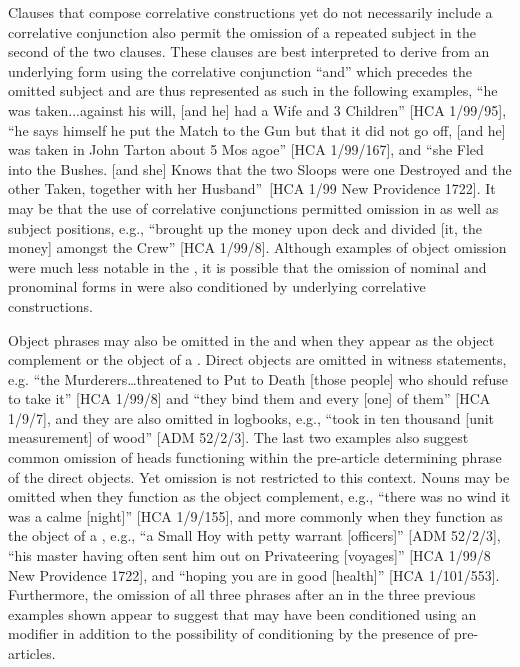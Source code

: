 Clauses that compose correlative constructions yet do not necessarily include a correlative conjunction also permit the omission of a repeated  subject in the second of the two clauses. These clauses are best interpreted to derive from an underlying form using the correlative conjunction “and” which precedes the omitted  subject and are thus represented as such in the following examples, “he was taken...against his will, [and he] had a Wife and 3 Children” [HCA 1/99/95], “he says himself he put the Match to the Gun but that it did not go off, [and he] was taken in John Tarton about 5 Mos agoe” [HCA 1/99/167], and “she Fled into the Bushes. [and she] Knows that the two Sloops were one Destroyed and the other Taken, together with her Husband”~[HCA 1/99 New Providence 1722]. It may be that the use of correlative conjunctions permitted  omission in  as well as subject positions, e.g., “brought up the money upon deck and divided [it, the money] amongst the Crew” [HCA 1/99/8]. Although examples of object omission were much less notable in the , it is possible that the omission of nominal and pronominal  forms in  were also conditioned by underlying correlative constructions. 

Object  phrases may also be omitted in the  and when they appear as the object complement or the object of a . Direct objects are omitted in witness statements, e.g. “the Murderers…threatened to Put to Death [those people] who should refuse to take it” [HCA 1/99/8] and “they bind them and every [one] of them” [HCA 1/9/7], and they are also omitted in logbooks, e.g., “took in ten thousand [unit measurement] of wood” [ADM 52/2/3]. The last two examples also suggest common omission of  heads functioning within the pre-article determining phrase of the direct objects. Yet omission is not restricted to this context. Nouns may be omitted when they function as the object complement, e.g., “there was no wind it was a calme [night]” [HCA 1/9/155], and more commonly when they function as the object of a , e.g., “a Small Hoy with petty warrant [officers]” [ADM 52/2/3], “his master having often sent him out on Privateering [voyages]” [HCA 1/99/8 New Providence 1722], and “hoping you are in good [health]” [HCA 1/101/553]. Furthermore, the omission of all three  phrases after an  in the three previous examples shown appear to suggest that  may have been conditioned using an  modifier in addition to the possibility of conditioning by the presence of pre-articles. 

